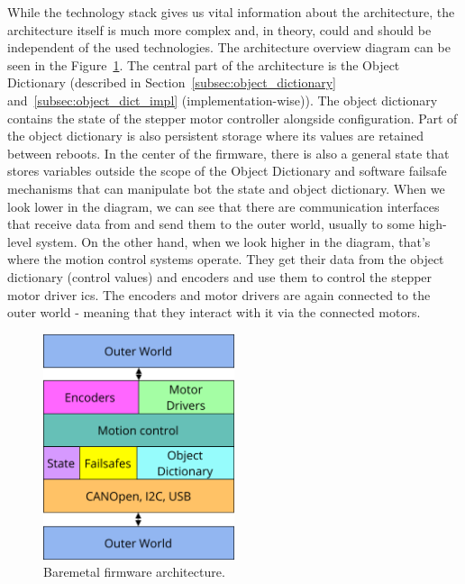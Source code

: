 While the technology stack gives us vital information about the architecture, the architecture itself is much more complex and, in theory, could and should be independent of the used technologies\cite{thomas_pragmatic_2019}.
The architecture overview diagram can be seen in the Figure~\ref{fig:firmware_arch}.
The central part of the architecture is the Object Dictionary (described in Section~\ref{subsec:object_dictionary} and~\ref{subsec:object_dict_impl} (implementation-wise)).
The object dictionary contains the state of the stepper motor controller alongside configuration.
Part of the object dictionary is also persistent storage where its values are retained between reboots.
In the center of the firmware, there is also a general state that stores variables outside the scope of the Object Dictionary and software failsafe mechanisms that can manipulate bot the state and object dictionary.
When we look lower in the diagram, we can see that there are communication interfaces that receive data from and send them to the outer world, usually to some high-level system.
On the other hand, when we look higher in the diagram, that's where the motion control systems operate.
They get their data from the object dictionary (control values) and encoders and use them to control the stepper motor driver \acs{ic}s.
The encoders and motor drivers are again connected to the outer world - meaning that they interact with it via the connected motors.

\begin{figure}[H]
    \centering
    \includegraphics[width=0.5\textwidth]{obrazky/firmware_arch}
    \caption{Bare\textendash metal firmware architecture.}
    \label{fig:firmware_arch}
\end{figure}

